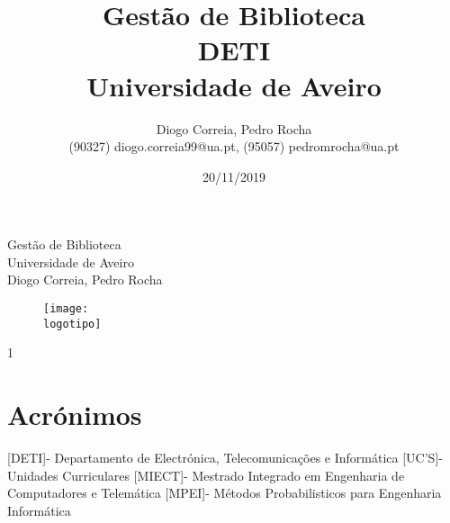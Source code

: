 \documentclass{report}
\begin{document}
%
\def\titulo{Gestão de Biblioteca}
\def\data{20/11/2019}
\def\autores{Diogo Correia, Pedro Rocha}
\def\autorescontactos{(90327) diogo.correia99@ua.pt, (95057) pedromrocha@ua.pt}
\def\versao{1}
\def\departamento{DETI}
\def\empresa{Universidade de Aveiro}
\def\logotipo{ua.pdf}
%
%
\begin{titlepage}

\begin{center}
%
\vspace*{50mm}
%
{\Huge \titulo}\\ 
%
\vspace{10mm}
%
{\Large \empresa}\\
%
\vspace{10mm}
%
{\LARGE \autores}\\ 
%
\vspace{30mm}
%
\begin{figure}[h]
\center
\texttt{[image: \\logotipo]}
\end{figure}
%
\vspace{30mm}
\end{center}
%
\begin{flushright}
\versao
\end{flushright}
\end{titlepage}

\title{%
{\Huge\textbf{\titulo}}\\
{\Large \departamento\\ \empresa}
}
%
\author{%
    \autores \\
    \autorescontactos
}
%
\date{\data}
%
\maketitle




\tableofcontents

\chapter*{Acrónimos}
\begin{acronym}
[DETI]{- Departamento de Electrónica, Telecomunicações e Informática}
 [UC'S]{- Unidades Curriculares}
[MIECT]{- Mestrado Integrado em Engenharia de Computadores e Telemática}
[MPEI]{- Métodos Probabilisticos para Engenharia Informática}
\end{acronym}
\clearpage
{}
\end{document}
